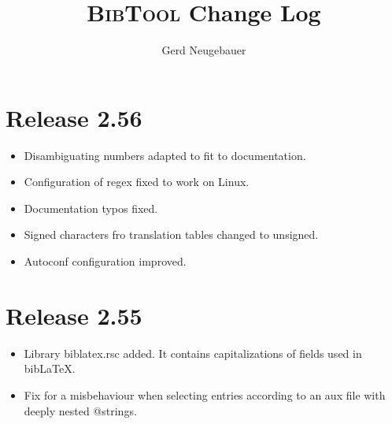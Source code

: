 \documentclass[11pt,a4paper]{scrartcl}
\newenvironment{Developers}{}{}
\newcommand\Developer[3]{}
\newcommand\File[1]{\textsf{#1}}
\newcommand\BibTool{\textsc{BibTool}}
\newenvironment{Release}[2]{\section*{Release #1}\begin{itemize}}{\end{itemize}}
\newenvironment{Fix}[1]{\item }{}
\newenvironment{New}[1]{\item }{}
\begin{document}

\title{\BibTool{} Change Log}
\author{Gerd Neugebauer}
\maketitle

\begin{Developers}
  \Developer{gene}{Gerd Neugebauer}{gene@gerd-neugebauer.de}
\end{Developers}

 \begin{Release}{2.56}{April 14, 2014}
  \begin{Fix}{gene}
    Disambiguating numbers adapted to fit to documentation.
  \end{Fix}
  \begin{Fix}{gene}
    Configuration of regex fixed to work on Linux.
  \end{Fix}
  \begin{Fix}{gene}
    Documentation typos fixed.
  \end{Fix}
  \begin{Fix}{gene}
    Signed characters fro translation tables changed to unsigned.
  \end{Fix}
  \begin{Fix}{gene}
    Autoconf configuration improved.
  \end{Fix}
 \end{Release}

 \begin{Release}{2.55}{April 15, 2012}
  \begin{New}{gene}
    Library \File{biblatex.rsc} added. It contains capitalizations of
    fields used in bib\LaTeX.
  \end{New}
  \begin{Fix}{gene}
    Fix for a misbehaviour when selecting entries according to an aux file
    with deeply nested @strings.
  \end{Fix}
 \end{Release}
\end{document}
